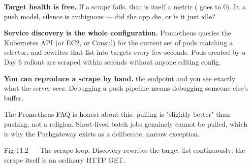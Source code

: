 \begin{wbitem}
  \item \textbf{Target health is free.} If a scrape fails, that is itself a metric ( goes to 0). In a push model, silence is ambiguous --- did the app die, or is it just idle?
  \item \textbf{Service discovery is the whole configuration.} Prometheus queries the Kubernetes API (or EC2, or Consul) for the current set of pods matching a selector, and rewrites that list into targets every few seconds. Pods created by a Day 6 rollout are scraped within seconds without anyone editing config.
  \item \textbf{You can reproduce a scrape by hand.}  the  endpoint and you see exactly what the server sees. Debugging a push pipeline means debugging someone else's buffer.
\end{wbitem}

The Prometheus FAQ is honest about this: pulling is "slightly better" than pushing, not a religion. Short-lived batch jobs genuinely cannot be pulled, which is why the Pushgateway exists as a deliberate, narrow exception.

\begin{wbfigure}{Fig 11.2 — The scrape loop. Discovery rewrites the target list continuously; the scrape itself is an ordinary HTTP GET.}
\end{wbfigure}

